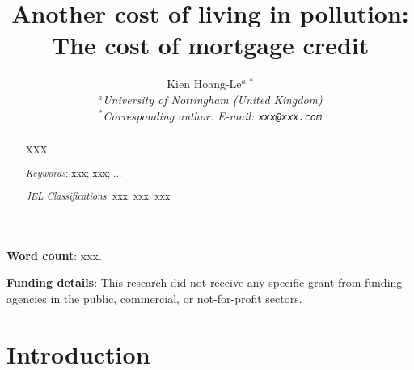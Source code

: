 \documentclass[a4paper,11pt]{article}
\begin{document}
	
	\title{\textbf{Another cost of living in pollution: The cost of mortgage credit}} 
	
\author{Kien Hoang-Le$^{a, *}$  \medskip \\
	$^{a}$\footnotesize \emph{University of Nottingham (United Kingdom)} \\
	$^{*}$\footnotesize \emph{Corresponding author. E-mail: \texttt{xxx@xxx.com}}
	\\
}	
	
\date{}
\maketitle
	
	
	
	\begin{abstract}
		
		XXX		
		
		\medskip
		
		\noindent \emph{Keywords}: xxx; xxx; ... \\ 
		\smallskip
		
		\noindent \emph{JEL Classifications}: xxx; xxx; xxx
		
	\end{abstract}

	
	
	\newpage

\newpage

\textbf{Word count}: xxx. \newline

\textbf{Funding details}: This research did not receive any specific grant from funding agencies in the public, commercial, or
not-for-profit sectors. \newline


\newpage


\section{Introduction}\label{intro}
\end{document}
